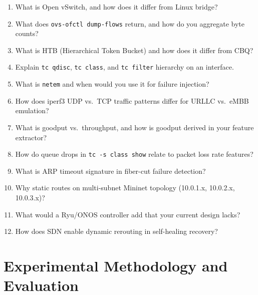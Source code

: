 \documentclass[11pt,a4paper]{article}
\begin{document}
\begin{enumerate}
    \item What is Open vSwitch, and how does it differ from Linux bridge?
    \item What does \texttt{ovs-ofctl dump-flows} return, and how do you aggregate byte counts?
    \item What is HTB (Hierarchical Token Bucket) and how does it differ from CBQ?
    \item Explain \texttt{tc qdisc}, \texttt{tc class}, and \texttt{tc filter} hierarchy on an interface.
    \item What is \texttt{netem} and when would you use it for failure injection?
    \item How does iperf3 UDP vs.\ TCP traffic patterns differ for URLLC vs.\ eMBB emulation?
    \item What is goodput vs.\ throughput, and how is goodput derived in your feature extractor?
    \item How do queue drops in \texttt{tc -s class show} relate to packet loss rate features?
    \item What is ARP timeout signature in fiber-cut failure detection?
    \item Why static routes on multi-subnet Mininet topology (10.0.1.x, 10.0.2.x, 10.0.3.x)?
    \item What would a Ryu/ONOS controller add that your current design lacks?
    \item How does SDN enable dynamic rerouting in self-healing recovery?
\end{enumerate}

\section{Experimental Methodology and Evaluation}
\end{document}
